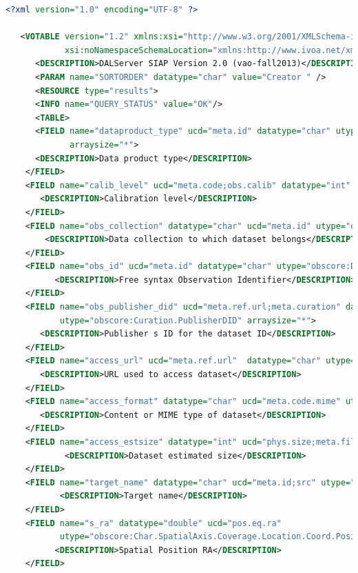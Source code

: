 \documentclass[11pt,a4paper]{ivoa}
\begin{document}
\begin{lstlisting}[basicstyle=\scriptsize,language=XML]
<?xml version="1.0" encoding="UTF-8" ?> 

   <VOTABLE version="1.2" xmlns:xsi="http://www.w3.org/2001/XMLSchema-instance" 
            xsi:noNamespaceSchemaLocation="xmlns:http://www.ivoa.net/xml/VOTable-1.2.xsd" > 
      <DESCRIPTION>DALServer SIAP Version 2.0 (vao-fall2013)</DESCRIPTION> 
      <PARAM name="SORTORDER" datatype="char" value="Creator " /> 
      <RESOURCE type="results"> 
      <INFO name="QUERY_STATUS" value="OK"/> 
      <TABLE> 
      <FIELD name="dataproduct_type" ucd="meta.id" datatype="char" utype="obscore:ObsDataSet.dataProductType" 
             arraysize="*"> 
      <DESCRIPTION>Data product type</DESCRIPTION>
    </FIELD> 
    <FIELD name="calib_level" ucd="meta.code;obs.calib" datatype="int" utype="obscore:ObsDataSet.calibLevel"> 
       <DESCRIPTION>Calibration level</DESCRIPTION>
    </FIELD> 
    <FIELD name="obs_collection" datatype="char" ucd="meta.id" utype="obscore:DataID.Collection" arraysize="*">            
        <DESCRIPTION>Data collection to which dataset belongs</DESCRIPTION>  
    </FIELD> 
    <FIELD name="obs_id" ucd="meta.id" datatype="char" utype="obscore:DataID.observationID" arraysize="*"> 
          <DESCRIPTION>Free syntax Observation Identifier</DESCRIPTION>
    </FIELD> 
    <FIELD name="obs_publisher_did" ucd="meta.ref.url;meta.curation" datatype="char"
           utype="obscore:Curation.PublisherDID" arraysize="*"> 
       <DESCRIPTION>Publisher s ID for the dataset ID</DESCRIPTION> 
    </FIELD> 
    <FIELD name="access_url" ucd="meta.ref.url"  datatype="char" utype="obscore:Access.Reference" arraysize="*">
       <DESCRIPTION>URL used to access dataset</DESCRIPTION> 
    </FIELD> 
    <FIELD name="access_format" datatype="char" ucd="meta.code.mime" utype="obscore:Access.Format" arraysize="*"> 
       <DESCRIPTION>Content or MIME type of dataset</DESCRIPTION>          
    </FIELD> 
    <FIELD name="access_estsize" datatype="int" ucd="phys.size;meta.file" utype="obscore:Access.Size"> 
            <DESCRIPTION>Dataset estimated size</DESCRIPTION>
    </FIELD> 
    <FIELD name="target_name" datatype="char" ucd="meta.id;src" utype="obscore:Target.Name" arraysize="*"> 
           <DESCRIPTION>Target name</DESCRIPTION>
    </FIELD> 
    <FIELD name="s_ra" datatype="double" ucd="pos.eq.ra" 
           utype="obscore:Char.SpatialAxis.Coverage.Location.Coord.Position2D.Value2.C1" unit="deg" > 
          <DESCRIPTION>Spatial Position RA</DESCRIPTION>          
    </FIELD> 

\end{lstlisting}
\end{document}
